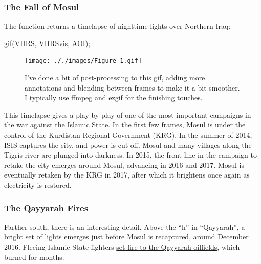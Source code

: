 \documentclass[
  letterpaper,
  DIV=11,
  numbers=noendperiod]{scrreprt}
\newenvironment{Shaded}{\begin{snugshade}}{\end{snugshade}}
\newcommand{\FunctionTok}[1]{\textcolor[rgb]{0.28,0.35,0.67}{#1}}
\newcommand{\NormalTok}[1]{\textcolor[rgb]{0.00,0.23,0.31}{#1}}
\newcommand{\OperatorTok}[1]{\textcolor[rgb]{0.37,0.37,0.37}{#1}}
\begin{document}
\hypertarget{the-fall-of-mosul}{%
\subsubsection*{The Fall of Mosul}\label{the-fall-of-mosul}}

The function returns a timelapse of nighttime lights over Northern Iraq:

\begin{Shaded}
\begin{Highlighting}[]
\FunctionTok{gif}\NormalTok{(VIIRS}\OperatorTok{,}\NormalTok{ VIIRSvis}\OperatorTok{,}\NormalTok{ AOI)}\OperatorTok{;}
\end{Highlighting}
\end{Shaded}

\begin{figure}

{\centering \texttt{[image: ././images/Figure\_1.gif]}

}

\caption{I've done a bit of post-processing to this gif, adding more
annotations and blending between frames to make it a bit smoother. I
typically use \href{https://ffmpeg.org/}{ffmpeg} and
\href{https://ezgif.com/}{ezgif} for the finishing touches.}

\end{figure}

This timelapse gives a play-by-play of one of the most important
campaigns in the war against the Islamic State. In the first few frames,
Mosul is under the control of the Kurdistan Regional Government (KRG).
In the summer of 2014, ISIS captures the city, and power is cut off.
Mosul and many villages along the Tigris river are plunged into
darkness. In 2015, the front line in the campaign to retake the city
emerges around Mosul, advancing in 2016 and 2017. Mosul is eventually
retaken by the KRG in 2017, after which it brightens once again as
electricity is restored.

\hypertarget{the-qayyarah-fires}{%
\subsubsection*{The Qayyarah Fires}\label{the-qayyarah-fires}}

Farther south, there is an interesting detail. Above the ``h'' in
``Qayyarah'', a bright set of lights emerges just before Mosul is
recaptured, around December 2016. Fleeing Islamic State fighters
\href{https://time.com/iraq-fires/}{set fire to the Qayyarah oilfields},
which burned for months.
\end{document}
